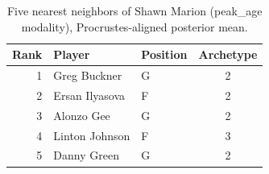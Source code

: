 \begin{table}[htbp]
  \centering\small
  \begin{tabular}{rllc}
    \toprule
    Rank & Player & Position & Archetype \\
    \midrule
    1 & Greg Buckner & G & 2 \\
    2 & Ersan Ilyasova & F & 2 \\
    3 & Alonzo Gee & G & 2 \\
    4 & Linton Johnson & F & 3 \\
    5 & Danny Green & G & 2 \\
    \bottomrule
  \end{tabular}
  \caption{Five nearest neighbors of Shawn Marion (peak_age modality), Procrustes-aligned posterior mean.}
  \label{tab:Shawn_Marion_neighbors_peak_age}
\end{table}

